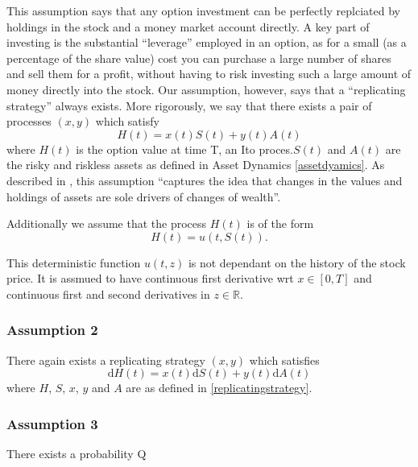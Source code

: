 \documentclass[11pt]{article} %
\begin{document}
This assumption says that any option investment can be perfectly replciated by holdings in 
the stock and a money market account directly. A key part of investing is the substantial 
``leverage'' employed in an option, as for a small (as a percentage of the share value) cost 
you can purchase a large number of shares and sell them for a profit, without having to risk 
investing such a large amount of money directly into the stock. Our assumption, however, says 
that a ``replicating strategy'' always exists. More rigorously, we say that there exists a 
pair of processes $(x,y)$ which satisfy 
\begin{equation}
    H(t) = x(t)S(t) + y(t)A(t)
\end{equation}
where $H(t)$ is the option value at time T, an Ito proces.$S(t)$ and $A(t)$ are the risky 
and riskless assets as defined in Asset Dynamics \ref{assetdyamics}. 
As described in \cite{blackscholes}, this assumption ``captures the idea that changes in the 
values and holdings of assets are sole drivers of changes of wealth''.

Additionally we assume that the process $H(t)$ is of  the form 
\begin{equation}
    H(t) = u(t, S(t)).
\end{equation}

This deterministic function $u(t,z)$ is not dependant on the history of the stock price. 
It is assmued to have continuous first derivative wrt $x \in [0,T]$ and continuous first 
and second derivatives in $z \in \mathbb{R}$.

\subsubsection{Assumption 2}
There again exists a replicating strategy $(x,y)$ which satisfies 
\begin{equation}\label{replicatingderivative}
    \mathrm{d} H(t) = x(t)\mathrm{d} S(t) + y(t)\mathrm{d} A(t)
\end{equation}
where $H$, $S$, $x$, $y$ and $A$ are as defined in \eqref{replicatingstrategy}.
\subsubsection{Assumption 3}
There exists a probability Q
\end{document}
